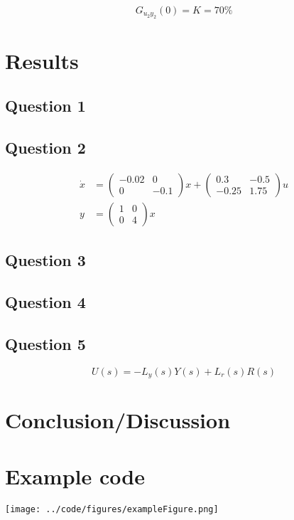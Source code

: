 \documentclass[a4paper, titlepage]{article}
\begin{document}
\begin{equation}
G_{u_2y_2}(0) = K = 70\% 
\end{equation}

\section{Results}

\subsection{Question 1}

\subsection{Question 2}

\begin{equation}
\begin{split}
\dot{x} &= 
\begin{pmatrix}
-0.02 & 0 \\ 0 & -0.1
\end{pmatrix}x
+
\begin{pmatrix}
0.3 & -0.5 \\ -0.25 & 1.75
\end{pmatrix}u \\
y &= 
\begin{pmatrix}
1 & 0 \\ 0 & 4
\end{pmatrix}x
\end{split}
\end{equation}

\subsection{Question 3}

\subsection{Question 4}

\subsection{Question 5}

\begin{equation}
U(s) = -L_y(s)Y(s) + L_r(s)R(s) 
\end{equation}



\section{Conclusion/Discussion}


\section{Example code}

\texttt{[image: ../code/figures/exampleFigure.png]}


\end{document}
